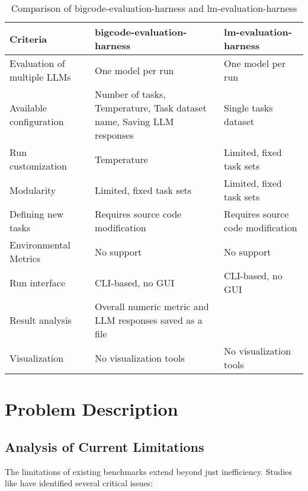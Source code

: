 \begin{table}[h]
\centering
\begin{tabular}{|p{4cm}|p{5cm}|p{5cm}|}
  \hline
        \textbf{Criteria} & \textbf{bigcode-evaluation-harness} & \textbf{lm-evaluation-harness} \\
        \hline
        Evaluation of multiple LLMs & One model per run & One model per run \\
        \hline
        Available configuration & Number of tasks, Temperature, Task dataset name, Saving LLM responses & Single tasks dataset \\
        \hline
        Run customization & Temperature & Limited, fixed task sets \\
        \hline
        Modularity & Limited, fixed task sets & Limited, fixed task sets \\
        \hline
        Defining new tasks & Requires source code modification & Requires source code modification \\
        \hline
        Environmental Metrics & No support & No support \\
        \hline
        Run interface & CLI-based, no GUI & CLI-based, no GUI \\
        \hline
        Result analysis & Overall numeric metric and LLM responses saved as a file &  \\
        \hline
        Visualization & No visualization tools & No visualization tools \\
        \hline
    \end{tabular}
    \caption{Comparison of bigcode-evaluation-harness and lm-evaluation-harness}
    \label{tab:framework-comparison}
\end{table}

\chapter{Problem Description}

\section{Analysis of Current Limitations}

The limitations of existing benchmarks extend beyond just inefficiency. Studies like  have identified several critical issues:

